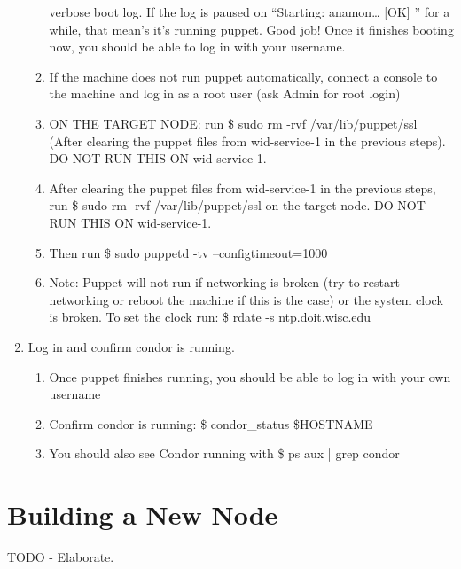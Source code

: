 \documentclass[10pt,letterpaper]{article}
\begin{document}
\begin{enumerate}
\begin{enumerate}
            verbose boot log. If the log is paused on “{\selectfont Starting:
            anamon…     [OK] }” for a while, that mean’s it’s running puppet. Good
            job! Once it finishes booting now, you should be able to log in with your username.
            \item If the machine does not run puppet automatically, connect a console
            to the machine and log in as a root user (ask Admin for root login)
            \item ON THE TARGET NODE: run {\selectfont \$ sudo rm -rvf /var/lib/puppet/ssl }
            (After clearing the puppet files from wid-service-1 in the previous
            steps). DO NOT RUN THIS ON wid-service-1.
            \item After clearing the puppet files from wid-service-1 in the previous
            steps, run {\selectfont \$ sudo rm -rvf /var/lib/puppet/ssl }
            on the target node. DO NOT RUN THIS ON wid-service-1.
            \item Then run {\selectfont \$ sudo puppetd -tv
            --configtimeout=1000 }
            \item Note: Puppet will not run if networking is broken (try to restart
            networking or reboot the machine if this is the case) or the system
            clock is broken. To set the clock run: {\selectfont
            \$ rdate -s ntp.doit.wisc.edu }
        \end{enumerate}
        \item Log in and confirm condor is running.
            \begin{enumerate}
                \item Once puppet finishes running, you should be able to log in
                with your own username
                \item Confirm condor is running: {\selectfont \$
                condor\_status \$HOSTNAME }
                \item You should also see Condor running with {\selectfont
                \$ ps aux | grep condor }
            \end{enumerate}
    \end{enumerate}
\clearpage

\section{Building a New Node}
    TODO - Elaborate. \\
\end{document}
